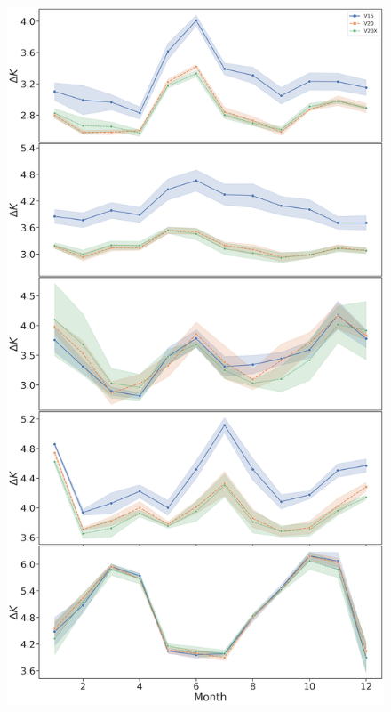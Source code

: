 \documentclass[hess, twostagejnl]{copernicus}
\providecommand{\DIFaddbeginFL}{} %
\providecommand{\DIFdelbeginFL}{} %
\providecommand{\DIFdelendFL}{} %
\begin{document}
	\begin{figure}
	\DIFdelbeginFL %
\DIFdelendFL \DIFaddbeginFL \includegraphics[scale=0.2]{new_timeseries_noise}

\end{figure}
\end{document}

